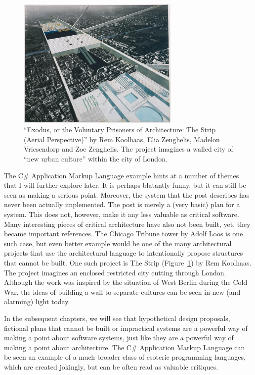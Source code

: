 \begin{figure}
\centering
\includegraphics[width=0.7\textwidth]{chapters/fig/strip.jpg}\quad
\caption{``Exodus, or the Voluntary Prisoners of Architecture: The Strip (Aerial Perspective)''
by Rem Koolhaas, Elia Zenghelis, Madelon Vriesendorp and Zoe Zenghelis. The project
imagines a walled city of ``new urban culture'' within the city of London.}
\label{fig:exodus}
\end{figure}

The C\# Application Markup Language example hints at a number of themes that I will further
explore later. It is perhaps blatantly funny, but it can still be seen as making a serious point.
Moreover, the system that the post describes has never been actually implemented. The post
is merely a (very basic) plan for a system. This does not, however, make it any less valuable
as critical software. Many interesting pieces of critical architecture have also not been
built, yet, they became important references. The Chicago Tribune tower by Adolf Loos is one
such case, but even better example would be one of the many architectural projects that
use the architectural language to intentionally propose structures that cannot be built.
One such project is The Strip (Figure~\ref{fig:exodus}) by Rem Koolhaas. The project imagines
an enclosed restricted city cutting through London. Although the work was inspired by the
situation of West Berlin during the Cold War, the ideas of building a wall to separate cultures
can be seen in new (and alarming) light today.

In the subsequent chapters, we will see that hypothetical design proposals, fictional
plans that cannot be built or impractical systems are a powerful way of making a point
about software systems, just like they are a powerful way of making a point about architecture.
The C\# Application Markup Language can be seen an example of a much broader class of
esoteric programming languages, which are created jokingly, but can be often read as
valuable critiques.

